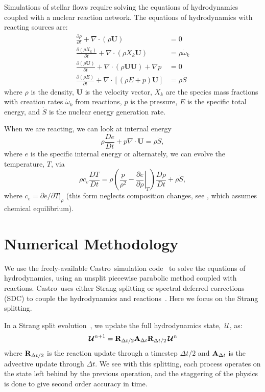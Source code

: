 \documentclass[times,preprint]{aastex63}
\newcommand{\castro}{{\sf Castro}}
\newcommand{\Ub}{\mathbf{U}}
\newcommand{\omegadot}{\dot{\omega}}
\newcommand{\Sdot}{\dot{S}}
\newcommand{\Uc}{{\,\bm{\mathcal{U}}}}
\begin{document}
Simulations of stellar flows require solving the equations of
hydrodynamics coupled with a nuclear reaction network.  The equations
of hydrodynamics with reacting sources are:
\begin{align}
\frac{\partial \rho}{\partial t} + \nabla \cdot (\rho \Ub) &= 0 \\
\frac{\partial (\rho X_k)}{\partial t} + \nabla \cdot (\rho X_k \Ub) &= \rho \omegadot_k \\
\frac{\partial (\rho \Ub)}{\partial t} + \nabla \cdot (\rho \Ub \Ub) + \nabla p &= 0 \\
\frac{\partial (\rho E)}{\partial t} + \nabla \cdot \left [ (\rho E + p) \Ub \right ] &= \rho \Sdot
\end{align}
where $\rho$ is the density, $\Ub$ is the velocity vector, $X_k$ are the species mass fractions
with creation rates $\omegadot_k$ from reactions, $p$ is the pressure, $E$ is the
specific total energy, and $\Sdot$ is the nuclear energy generation rate.

When we are reacting, we can look at internal energy
\begin{equation}
\rho \frac{De}{Dt} + p \nabla \cdot \Ub = \rho \Sdot,
\end{equation}
where $e$ is the specific internal energy or alternately, we can evolve the temperature, $T$,
via
\begin{equation}
\rho c_v \frac{DT}{Dt} = \rho \left (\frac{p}{\rho^2} - \left .\frac{\partial e}{\partial \rho} \right |_T \right ) \frac{D\rho}{Dt} + \rho \Sdot,
\end{equation}
where $c_v = \partial e / \partial T |_\rho$ (this form neglects composition
changes, see \citealt{ABNZ:III}, which assumes chemical
equilibrium). 


\section{Numerical Methodology}

We use the freely-available \castro\ simulation
code~\citep{castro,castro_joss} to solve the equations of
hydrodynamics, using an unsplit piecewise parabolic method coupled with
reactions.  \castro\ uses either Strang splitting or
spectral deferred corrections (SDC) to couple the hydrodynamics and
reactions~\citep{castro_sdc}.  Here we focus on the Strang splitting.

In a Strang split evolution~\citep{strang:1968}, we update the full
hydrodynamics state, $\Uc$, as:
\begin{equation}
  \Uc^{n+1} = {\bf R}_{\Delta t/2} {\bf A}_{\Delta t} {\bf R}_{\Delta t/2} \Uc^n
\end{equation}
where ${\bf R}_{\Delta t/2}$ is the reaction update through a timestep
$\Delta t/2$ and ${\bf A}_{\Delta t}$ is the advective update through
$\Delta t$.  We see with this splitting, each process operates on the
state left behind by the previous operation, and the staggering of the
physics is done to give second order accuracy in time.
\end{document}
